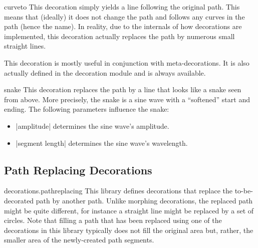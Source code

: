 \begin{decoration}{curveto}
    This decoration simply yields a line following the original path. This
    means that (ideally) it does not change the path and follows any curves in
    the path (hence the name). In reality, due to the internals of how
    decorations are implemented, this decoration actually replaces the path by
    numerous small straight lines.

    This decoration is mostly useful in conjunction with meta-decorations. It
    is also actually defined in the decoration module and is always available.
\begin{codeexample}[preamble={\usetikzlibrary{decorations.pathmorphing}}]
\end{codeexample}
\end{decoration}

\begin{decoration}{snake}
    This decoration replaces the path by a line that looks like a snake seen
    from above. More precisely, the snake is a sine wave with a ``softened''
    start and ending. The following parameters influence the snake:
    \begin{itemize}
        \item |amplitude| determines the sine wave's amplitude.
        \item |segment length| determines the sine wave's wavelength.
    \end{itemize}
\begin{codeexample}[preamble={\usetikzlibrary{decorations.pathmorphing}}]
\end{codeexample}
\end{decoration}


\subsection{Path Replacing Decorations}

\begin{pgflibrary}{decorations.pathreplacing}
    This library defines decorations that replace the to-be-decorated path by
    another path. Unlike morphing decorations, the replaced path might be quite
    different, for instance a straight line might be replaced by a set of
    circles. Note that filling a path that has been replaced using one of the
    decorations in this library typically does not fill the original area but,
    rather, the smaller area of the newly-created path segments.
\end{pgflibrary}

